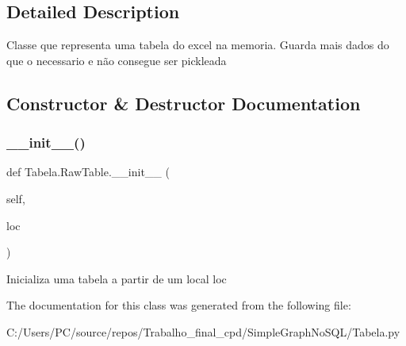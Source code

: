 \subsection{Detailed Description}
\begin{DoxyVerb}Classe que representa uma tabela do excel na memoria. Guarda mais dados do que o necessario e não consegue ser pickleada\end{DoxyVerb}
 

\subsection{Constructor \& Destructor Documentation}
\mbox{\label{class_tabela_1_1_raw_table_afceb720336b1c4ac7084cfc2719514fa}} 
\subsubsection{\texorpdfstring{\+\_\+\+\_\+init\+\_\+\+\_\+()}{\_\_init\_\_()}}
{\footnotesize\ttfamily def Tabela.\+Raw\+Table.\+\_\+\+\_\+init\+\_\+\+\_\+ (\begin{DoxyParamCaption}\item[{}]{self,  }\item[{}]{loc }\end{DoxyParamCaption})}

\begin{DoxyVerb}Inicializa uma tabela a partir de um local loc\end{DoxyVerb}
 

The documentation for this class was generated from the following file\+:\begin{DoxyCompactItemize}
\item 
C\+:/\+Users/\+P\+C/source/repos/\+Trabalho\+\_\+final\+\_\+cpd/\+Simple\+Graph\+No\+S\+Q\+L/Tabela.\+py\end{DoxyCompactItemize}
